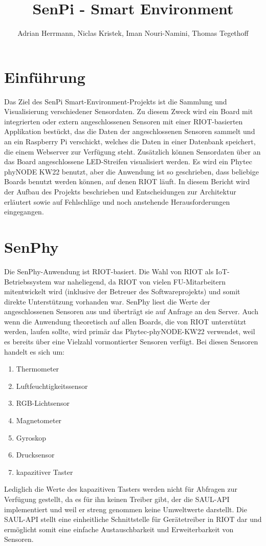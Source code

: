 \documentclass[a4paper]{article}
\title{SenPi - Smart Environment}
\author{Adrian Herrmann, Niclas Kristek, Iman Nouri-Namini, Thomas Tegethoff}
\begin{document}
\maketitle

\section{Einführung}

Das Ziel des SenPi Smart-Environment-Projekts ist die Sammlung und Visualisierung verschiedener Sensordaten. Zu diesem Zweck wird ein Board mit integrierten oder extern angeschlossenen Sensoren mit einer RIOT-basierten Applikation bestückt, das die Daten der angeschlossenen Sensoren sammelt und an ein Raspberry Pi verschickt, welches die Daten in einer Datenbank speichert, die einem Webserver zur Verfügung steht. Zusätzlich können Sensordaten über an das Board angeschlossene LED-Streifen visualisiert werden. Es wird ein Phytec phyNODE KW22 benutzt, aber die Anwendung ist so geschrieben, dass beliebige Boards benutzt werden können, auf denen RIOT läuft. In diesem Bericht wird der Aufbau des Projekts beschrieben und Entscheidungen zur Architektur erläutert sowie auf Fehlschläge und noch anstehende Herausforderungen eingegangen.

\section{SenPhy}
Die SenPhy-Anwendung ist RIOT-basiert. Die Wahl von RIOT als IoT-Betriebssystem war naheliegend, da RIOT von vielen FU-Mitarbeitern mitentwickelt wird (inklusive der Betreuer des Softwareprojekts) und somit direkte Unterstützung vorhanden war. SenPhy liest die Werte der angeschlossenen Sensoren aus und überträgt sie auf Anfrage an den Server. Auch wenn die Anwendung theoretisch auf allen Boards, die von RIOT unterstützt werden, laufen sollte, wird primär das Phytec-phyNODE-KW22 verwendet, weil es bereits über eine Vielzahl vormontierter Sensoren verfügt. Bei diesen Sensoren handelt es sich um:
\begin{enumerate}
	\item Thermometer
    \item Luftfeuchtigkeitssensor
    \item RGB-Lichtsensor
    \item Magnetometer
    \item Gyroskop
    \item Drucksensor
    \item kapazitiver Taster
\end{enumerate}
Lediglich die Werte des kapazitiven Tasters werden nicht für Abfragen zur Verfügung gestellt, da es für ihn keinen Treiber gibt, der die SAUL-API implementiert und weil er streng genommen keine Umweltwerte darstellt. Die SAUL-API stellt eine einheitliche Schnittstelle für Gerätetreiber in RIOT dar und ermöglicht somit eine einfache Austauschbarkeit und Erweiterbarkeit von Sensoren.
\end{document}
